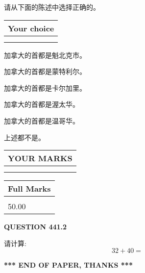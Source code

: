 \documentclass{ctexart}
\begin{document}
  
请从下面的陈述中选择正确的。
  
  
\noindent\hspace{3.0in} \begin{tabular}{|l|}
\hline
Your choice \\
\hline
 \\ 
 \\ 
\hline
\end{tabular}
  
  
 
 
加拿大的首都是魁北克市。
 
 
加拿大的首都是蒙特利尔。
 
 
加拿大的首都是卡尔加里。
 
 
加拿大的首都是渥太华。
 
 
加拿大的首都是温哥华。
 
 
 上述都不是。
 
 
  
\vspace{0.2in}
  
\noindent\begin{tabular}{|l|}
\hline
 YOUR MARKS  \\
\hline
 \\ 
 \\ 
\hline
\end{tabular}
\hspace{0.05in} \begin{tabular}{|l|}
\hline
 Full Marks  \\
\hline
 \\ 
50.00 \\
\hline
\end{tabular}
{\textbf{\Large{QUESTION
441.2 
}}}
  
  
 
请计算:
\begin{equation}
32 +  %
40 = \nonumber
\end{equation}
 

 

 
   
   
 \vspace{0.2in}
 
   
   
   
   
\vspace{1.0in} 
{\textbf{\large{ *** END OF PAPER, THANKS *** }}} 
   
\end{document}

